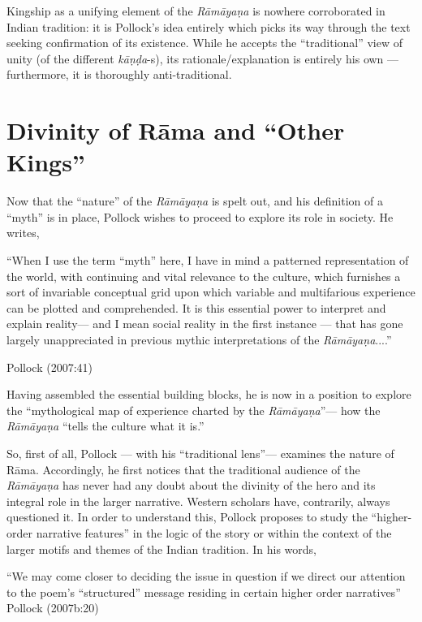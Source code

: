 Kingship as a unifying element of the {\sl Rāmāyaṇa} is nowhere corroborated in Indian tradition: it is Pollock’s idea entirely which picks its way through the text seeking confirmation of its existence. While he accepts the “traditional” view of unity (of the different \hbox{{\sl kāṇḍa}-s}), its rationale/explanation is entirely his own --- furthermore, it is thoroughly anti-traditional.

\section{Divinity of Rāma and “Other Kings”}\label{sec2.4}

Now that the “nature” of the {\sl Rāmāyaṇa} is spelt out, and his definition of a “myth” is in place, Pollock wishes to proceed to explore its role in society. He writes, 

\begin{myquote}
“When I use the term “myth” here, I have in mind a patterned representation of the world, with continuing and vital relevance to the culture, which furnishes a sort of invariable conceptual grid upon which variable and multifarious experience can be plotted and comprehended. It is this essential power to interpret and explain reality--- and I mean social reality in the first instance --- that has gone largely unappreciated in previous mythic interpretations of the {\sl Rāmāyaṇa}....” 

\hfill Pollock (2007:41)
\end{myquote}

Having assembled the essential building blocks, he is now in a position to explore the “mythological map of experience charted by the {\sl Rāmāyaṇa}”--- how the {\sl Rāmāyaṇa} “tells the culture what it is.” 

So, first of all, Pollock --- with his “traditional lens”--- examines the nature of Rāma. Accordingly, he first notices that the traditional audience of the {\sl Rāmāyaṇa} has never had any doubt about the divinity of the hero and its integral role in the larger narrative. Western scholars have, contrarily, always questioned it. In order to understand this, Pollock proposes to study the “higher-order narrative features” in the logic of the story or within the context of the larger motifs and themes of the Indian tradition. In his words,

\begin{myquote}
“We may come closer to deciding the issue in question if we direct our attention to the poem’s “structured” message residing in certain higher order narratives”
\hfill Pollock (2007b:20)
\end{myquote}

